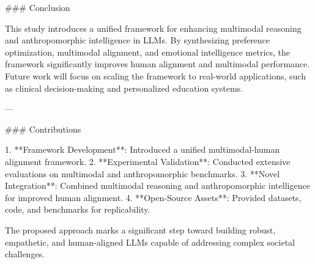 ### Conclusion

This study introduces a unified framework for enhancing multimodal reasoning and anthropomorphic intelligence in LLMs. By synthesizing preference optimization, multimodal alignment, and emotional intelligence metrics, the framework significantly improves human alignment and multimodal performance. Future work will focus on scaling the framework to real-world applications, such as clinical decision-making and personalized education systems.

---

### Contributions

1. **Framework Development**: Introduced a unified multimodal-human alignment framework.
2. **Experimental Validation**: Conducted extensive evaluations on multimodal and anthropomorphic benchmarks.
3. **Novel Integration**: Combined multimodal reasoning and anthropomorphic intelligence for improved human alignment.
4. **Open-Source Assets**: Provided datasets, code, and benchmarks for replicability.

The proposed approach marks a significant step toward building robust, empathetic, and human-aligned LLMs capable of addressing complex societal challenges.